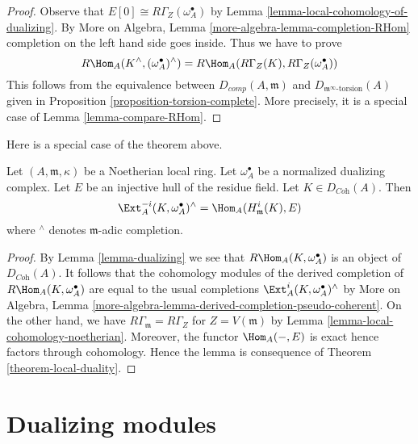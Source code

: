 \begin{proof}
Observe that $E[0] \cong R\Gamma_Z(\omega_A^\bullet)$ by
Lemma \ref{lemma-local-cohomology-of-dualizing}.
By More on Algebra, Lemma \ref{more-algebra-lemma-completion-RHom}
completion on the left hand side goes inside.
Thus we have to prove
$$
R\Hom_A(K^\wedge, (\omega_A^\bullet)^\wedge)
=
R\Hom_A(R\Gamma_Z(K), R\Gamma_Z(\omega_A^\bullet))
$$
This follows from the equivalence between
$D_{comp}(A, \mathfrak m)$ and $D_{\mathfrak m^\infty\text{-torsion}}(A)$
given in Proposition \ref{proposition-torsion-complete}.
More precisely, it is a special case of Lemma \ref{lemma-compare-RHom}.
\end{proof}

\noindent
Here is a special case of the theorem above.

\begin{lemma}
\label{lemma-special-case-local-duality}
Let $(A, \mathfrak m, \kappa)$ be a Noetherian local ring.
Let $\omega_A^\bullet$ be a normalized dualizing complex.
Let $E$ be an injective hull of the residue field.
Let $K \in D_{\textit{Coh}}(A)$. Then
$$
\Ext^{-i}_A(K, \omega_A^\bullet)^\wedge =
\Hom_A(H^i_{\mathfrak m}(K), E)
$$
where ${}^\wedge$ denotes $\mathfrak m$-adic completion.
\end{lemma}

\begin{proof}
By Lemma \ref{lemma-dualizing} we see that $R\Hom_A(K, \omega_A^\bullet)$
is an object of $D_{\textit{Coh}}(A)$.
It follows that the cohomology modules of the derived completion
of $R\Hom_A(K, \omega_A^\bullet)$ are equal to the usual completions
$\Ext^i_A(K, \omega_A^\bullet)^\wedge$ by
More on Algebra, Lemma
\ref{more-algebra-lemma-derived-completion-pseudo-coherent}.
On the other hand, we have $R\Gamma_{\mathfrak m} = R\Gamma_Z$
for $Z = V(\mathfrak m)$ by Lemma \ref{lemma-local-cohomology-noetherian}.
Moreover, the functor $\Hom_A(-, E)$ is exact hence
factors through cohomology.
Hence the lemma is consequence of
Theorem \ref{theorem-local-duality}.
\end{proof}





\section{Dualizing modules}
\label{section-dualizing-module}

